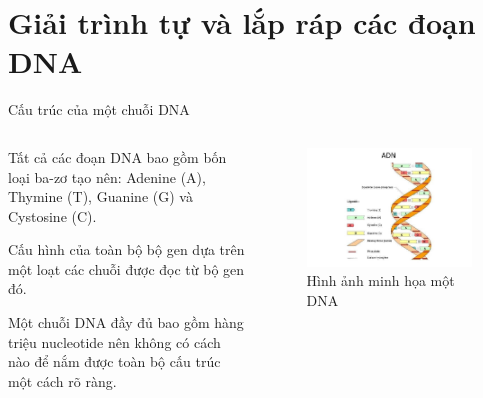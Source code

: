\documentclass[10pt]{beamer}
\theoremstyle{remark}
\numberwithin{algocf}{section}
\numberwithin{equation}{section}
\numberwithin{dl}{section}
\numberwithin{figure}{section}
\begin{document}
\section{Giải trình tự và lắp ráp các đoạn DNA}

\begin{frame}{Cấu trúc của một chuỗi DNA}
    \begin{columns}
        \begin{column}{0.47\textwidth}
            Tất cả các đoạn DNA bao gồm bốn loại ba-zơ tạo nên: Adenine (A), Thymine (T), Guanine (G) và Cystosine (C).

            Cấu hình của toàn bộ bộ gen dựa trên một loạt các chuỗi được đọc từ bộ gen đó.

            Một chuỗi DNA đầy đủ bao gồm hàng triệu nucleotide nên không có cách nào để nắm được toàn bộ cấu trúc một cách rõ ràng.
        \end{column}
        \begin{column}{0.47\textwidth}
            \begin{figure}[h!]
                \centering
                \includegraphics[height=0.75\textheight]{figures/dna_strands_example.jpg}
                \caption{Hình ảnh minh họa một DNA}
            \end{figure}
        \end{column}
    \end{columns}
        
        
\end{frame}
\end{document}
